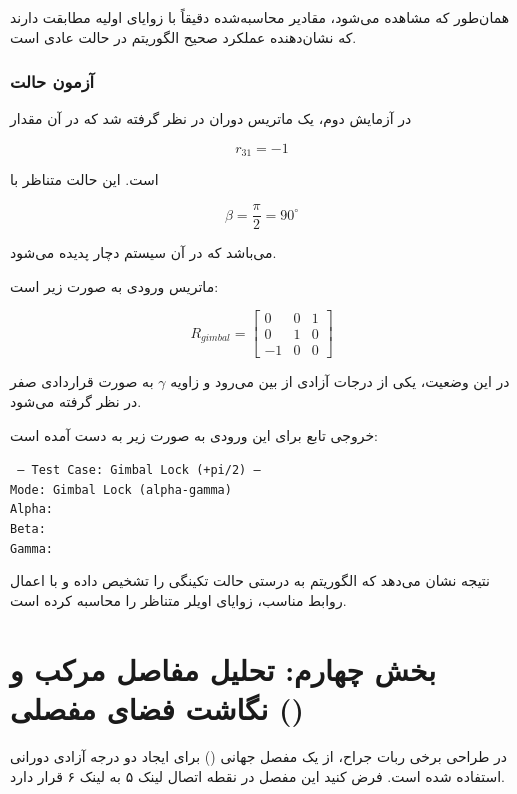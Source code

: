 \documentclass{article}
\begin{document}
همان‌طور که مشاهده می‌شود، مقادیر محاسبه‌شده دقیقاً با زوایای اولیه مطابقت دارند که نشان‌دهنده عملکرد صحیح الگوریتم در حالت عادی است.

\subsubsection{آزمون حالت }

در آزمایش دوم، یک ماتریس دوران در نظر گرفته شد که در آن مقدار

\[
r_{31} = -1
\]

است. این حالت متناظر با

\[
\beta = \frac{\pi}{2} = 90^\circ
\]

می‌باشد که در آن سیستم دچار پدیده  می‌شود.

ماتریس ورودی به صورت زیر است:

\[
R_{gimbal} =
\begin{bmatrix}
	0 & 0 & 1 \\
	0 & 1 & 0 \\
	-1 & 0 & 0
\end{bmatrix}
\]

در این وضعیت، یکی از درجات آزادی از بین می‌رود و زاویه $\gamma$ به صورت قراردادی صفر در نظر گرفته می‌شود.

خروجی تابع برای این ورودی به صورت زیر به دست آمده است:
\begin{LTR}
	\texttt{
		--- Test Case: Gimbal Lock (+pi/2) ---\\
		Mode:  Gimbal Lock (alpha-gamma)\\
		Alpha: \\
		Beta:  \\
		Gamma: 
	}
\end{LTR}
نتیجه نشان می‌دهد که الگوریتم به درستی حالت تکینگی را تشخیص داده و با اعمال روابط مناسب، زوایای اویلر متناظر را محاسبه کرده است.
\newpage
\section{بخش چهارم: تحلیل مفاصل مرکب و نگاشت فضای مفصلی ()}

در طراحی برخی ربات‌ جراح، از یک مفصل جهانی () برای ایجاد دو درجه آزادی دورانی استفاده شده است.
فرض کنید این مفصل در نقطه اتصال لینک ۵ به لینک ۶ قرار دارد.
\end{document}
